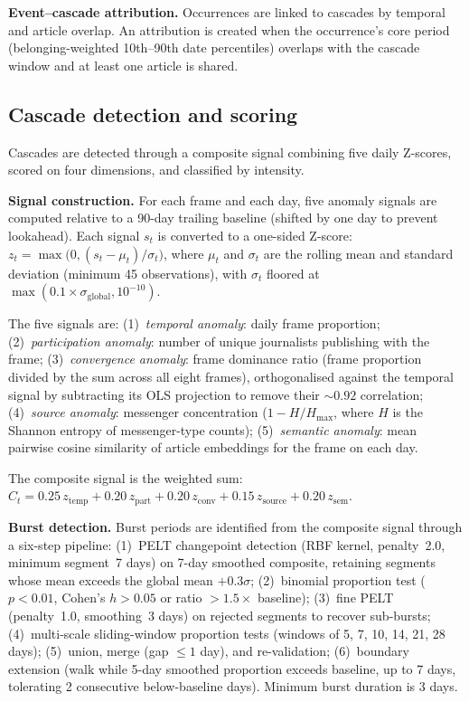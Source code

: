\textbf{Event--cascade attribution.} Occurrences are linked to cascades by temporal and article overlap. An attribution is created when the occurrence's core period (belonging-weighted 10th--90th date percentiles) overlaps with the cascade window and at least one article is shared.

\subsection*{Cascade detection and scoring}

Cascades are detected through a composite signal combining five daily Z-scores, scored on four dimensions, and classified by intensity.

\textbf{Signal construction.} For each frame and each day, five anomaly signals are computed relative to a 90-day trailing baseline (shifted by one day to prevent lookahead). Each signal $s_t$ is converted to a one-sided Z-score: $z_t = \max\bigl(0, (s_t - \mu_t)/\sigma_t\bigr)$, where $\mu_t$ and $\sigma_t$ are the rolling mean and standard deviation (minimum 45 observations), with $\sigma_t$ floored at $\max(0.1 \times \sigma_{\text{global}}, 10^{-10})$.

The five signals are: (1)~\emph{temporal anomaly}: daily frame proportion; (2)~\emph{participation anomaly}: number of unique journalists publishing with the frame; (3)~\emph{convergence anomaly}: frame dominance ratio (frame proportion divided by the sum across all eight frames), orthogonalised against the temporal signal by subtracting its OLS projection to remove their ${\sim}0.92$ correlation; (4)~\emph{source anomaly}: messenger concentration ($1 - H/H_{\max}$, where $H$ is the Shannon entropy of messenger-type counts); (5)~\emph{semantic anomaly}: mean pairwise cosine similarity of article embeddings for the frame on each day.

The composite signal is the weighted sum: $C_t = 0.25\, z_{\text{temp}} + 0.20\, z_{\text{part}} + 0.20\, z_{\text{conv}} + 0.15\, z_{\text{source}} + 0.20\, z_{\text{sem}}$.

\textbf{Burst detection.} Burst periods are identified from the composite signal through a six-step pipeline: (1)~PELT changepoint detection (RBF kernel, penalty~2.0, minimum segment~7 days) on 7-day smoothed composite, retaining segments whose mean exceeds the global mean $+ 0.3\sigma$; (2)~binomial proportion test ($p < 0.01$, Cohen's $h > 0.05$ or ratio $> 1.5\times$ baseline); (3)~fine PELT (penalty~1.0, smoothing~3 days) on rejected segments to recover sub-bursts; (4)~multi-scale sliding-window proportion tests (windows of 5, 7, 10, 14, 21, 28 days); (5)~union, merge (gap $\leq 1$ day), and re-validation; (6)~boundary extension (walk while 5-day smoothed proportion exceeds baseline, up to 7 days, tolerating 2 consecutive below-baseline days). Minimum burst duration is 3 days.

